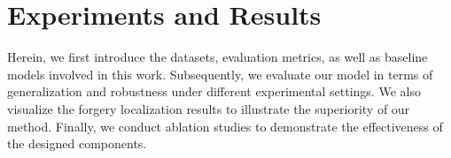 \documentclass[10pt,journal,compsoc]{IEEEtran}
\begin{document}



\section{Experiments and Results}
Herein, we first introduce the datasets, evaluation metrics, as well as baseline models involved in this work. Subsequently, we evaluate our model in terms of generalization and robustness under different experimental settings. We also visualize the forgery localization results to illustrate the superiority of our method. Finally, we conduct ablation studies to demonstrate the effectiveness of the designed components.
\end{document}
